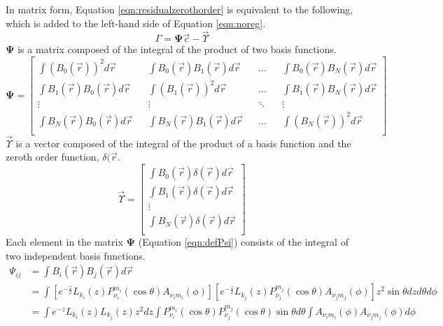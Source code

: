 \documentclass[12pt,letterpaper]{article}
\newcommand{\mat}[1]{\mathbf{#1}}
\begin{document}
    In matrix form, Equation \ref{eqn:residualzerothorder} is equivalent to the following, which is added to the left-hand side of Equation \ref{eqn:noreg}.
    \begin{equation}
      \label{eqn:zeroordreg}
      \Gamma = \mat{\Psi}\vec{c} - \vec{\Upsilon}
    \end{equation}
    \(\mat{\Psi}\) is a matrix composed of the integral of the product of two basis functions.
    \begin{equation}
      \label{eqn:defPsi}
      \mat{\Psi} = \begin{bmatrix}
                  \int (B_0(\vec{r}))^2 d\vec{r} && \int B_0(\vec{r})B_1(\vec{r}) d\vec{r} && \hdots && \int B_0(\vec{r})B_N(\vec{r}) d\vec{r} \\
                  \int B_1(\vec{r})B_0(\vec{r}) d\vec{r} && \int (B_1(\vec{r}))^2 d\vec{r} && \hdots && \int B_1(\vec{r})B_N(\vec{r}) d\vec{r} \\
                  \vdots && \vdots && \ddots && \vdots \\
                  \int B_N(\vec{r})B_0(\vec{r}) d\vec{r} && \int B_N(\vec{r})B_1(\vec{r}) d\vec{r} && \hdots && \int (B_N(\vec{r}))^2 d\vec{r} \\
                \end{bmatrix}
    \end{equation}
    \(\vec{\Upsilon}\) is a vector composed of the integral of the product of a basis function and the zeroth order function, \(\delta(\vec{r}\).
    \begin{equation}
      \label{eqn:defUps}
      \vec{\Upsilon} = \begin{bmatrix}
                  \int B_0(\vec{r})\delta(\vec{r}) d\vec{r} \\
                  \int B_1(\vec{r})\delta(\vec{r}) d\vec{r} \\
                  \vdots \\
                  \int B_N(\vec{r})\delta(\vec{r}) d\vec{r} \\
                \end{bmatrix}
    \end{equation}
    Each element in the matrix \(\mat{\Psi}\) (Equation \ref{eqn:defPsi}) consists of the integral of two independent basis functions.
    \begin{align}
      \Psi_{ij} &= \int B_i(\vec{r})B_j(\vec{r}) d\vec{r} \\
      &= \int \left[e^{-\frac{z}{2}}L_{k_i}(z)P_{\nu_i}^{m_i}(\cos\theta)A_{\nu_i m_i}(\phi)\right]\left[e^{-\frac{z}{2}}L_{k_j}(z)P_{\nu_j}^{m_j}(\cos\theta)A_{\nu_j m_j}(\phi)\right] z^2 \sin\theta dz d\theta d\phi \\
      &= \int e^{-z}L_{k_i}(z)L_{k_j}(z)z^2 dz \int P_{\nu_i}^{m_i}(\cos\theta)P_{\nu_j}^{m_j}(\cos\theta) \sin\theta d\theta \int A_{\nu_i m_i}(\phi)A_{\nu_j m_j}(\phi) d\phi
    \end{align}
\end{document}
